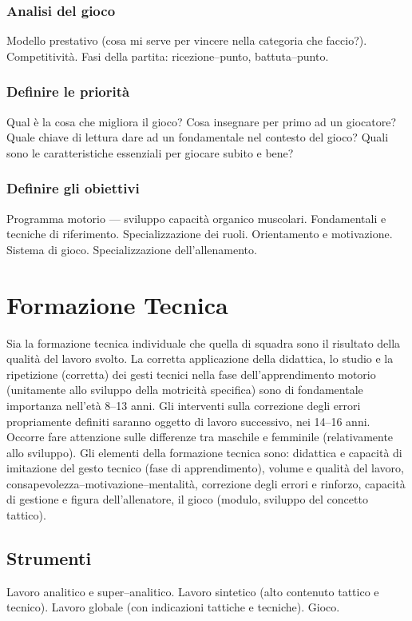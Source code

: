 \subsubsection{Analisi del gioco}
Modello prestativo (cosa mi serve per vincere nella categoria che faccio?).
Competitività.
Fasi della partita: ricezione--punto, battuta--punto.

\subsubsection{Definire le priorità}
Qual è la cosa che migliora il gioco? Cosa insegnare per primo ad un giocatore? Quale chiave di lettura dare ad un fondamentale nel contesto del gioco? Quali sono le caratteristiche essenziali per giocare subito e bene?

\subsubsection{Definire gli obiettivi}
Programma motorio --- sviluppo capacità organico muscolari.
Fondamentali e tecniche di riferimento.
Specializzazione dei ruoli.
Orientamento e motivazione.
Sistema di gioco.
Specializzazione dell'allenamento.

\section{Formazione Tecnica}
Sia la formazione tecnica individuale che quella di squadra sono il risultato della qualità del lavoro svolto. La corretta applicazione della didattica, lo studio e la ripetizione (corretta) dei gesti tecnici nella fase dell'apprendimento motorio (unitamente allo sviluppo della motricità specifica) sono di fondamentale importanza nell'età 8--13 anni.
Gli interventi sulla correzione degli errori propriamente definiti saranno oggetto di lavoro successivo, nei 14--16 anni.
Occorre fare attenzione sulle differenze tra maschile e femminile (relativamente allo sviluppo).
Gli elementi della formazione tecnica sono: didattica e capacità di imitazione del gesto tecnico (fase di apprendimento), volume e qualità del lavoro,  consapevolezza--motivazione--mentalità, correzione degli errori e rinforzo, capacità di gestione e figura dell'allenatore, il gioco (modulo, sviluppo del concetto tattico).


\subsection{Strumenti}
Lavoro analitico e super--analitico.
Lavoro sintetico (alto contenuto tattico e tecnico).
Lavoro globale (con indicazioni tattiche e tecniche).
Gioco.

